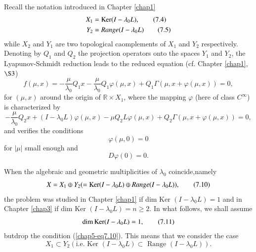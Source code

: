 Recall the notation introduced in Chapter \ref{chap1}
\begin{align*}
X_{1} & = \operatorname{Ker} (I - \lambda_{0}L),\tag{7.4}\label{chap5-eq7.4}\\
Y_{2} & = Range (I - \lambda_{0}L)\tag{7.5}\label{chap5-eq7.5}
\end{align*}\pageoriginale
while $X_{2}$ and $Y_{1}$ are two topological caomplements of $X_{1}$
and $Y_{2}$ respectively. Denoting by $Q_{1}$ and $Q_{2}$ the
projection operators onto the spaces $Y_{1}$ and $Y_{2}$, the
Lyapunov-Schmidt reduction leads to the reduced equation (cf. Chapter
\ref{chap1}, $\S 3$)
\begin{equation*}
f(\mu, x) = - \frac{\mu}{\lambda_{0}} Q_{1}x - \frac{\mu}{\lambda_{0}}
Q_{1}\varphi(\mu, x) + Q_{1}\Gamma(\mu, x + \varphi(\mu, x)) =
0,\tag{7.6}\label{chap5-eq7.6} 
\end{equation*}
for $(\mu, x)$ around the origin of $\mathbb{R} \times X_{1}$, where
the mapping $\varphi$ (here of class $C^{\infty}$) is characterized by
\begin{equation*}
- \frac{\mu}{\lambda_{0}} Q_{2}x + (I - \lambda_{0}L)\varphi(\mu,
x)-\mu Q_{2}L \varphi (\mu, x) + Q_{2}\Gamma(\mu, x + \varphi(\mu, x))
= 0,\tag{7.7}\label{chap5-eq7.7}
\end{equation*}
and verifies the conditions
\begin{equation*}
\varphi(\mu, 0) = 0\tag{7.8}\label{chap5-eq7.8}
\end{equation*}
for $|\mu|$ small enough and
\begin{equation*}
D\varphi(0) = 0.\tag{7.9}\label{chap5-eq7.9}
\end{equation*}


When the algebraic and geometric multiplicities of $\lambda_{0}$
coincide,\break namely
\begin{equation*}
X = X_{1} \oplus Y_{2} (= \operatorname{Ker} (I - \lambda_{0}L) \oplus Range (I -
\lambda_{0}L)),\tag{7.10}\label{chap5-eq7.10} 
\end{equation*}
the problem was studied in Chapter \ref{chap1} if dim Ker $(I -
\lambda_{0}L) = 1$ and in Chapter \ref{chap3} if dim Ker $(I -
\lambda_{0}L) = n \geq 2$. In what follows, we shall assume
\begin{equation*}
\dim \operatorname{Ker} (I - \lambda_{0}L) = 1,\tag{7.11}\label{chap5-eq7.11}
\end{equation*}
but\pageoriginale drop the condition (\ref{chap5-eq7.10}). This means
that we consider the case
\begin{equation*}
X_{1} \subset Y_{2} (\text{i.e. Ker }(I - \lambda_{0}L) \subset
\text{ Range } (I - \lambda_{0}L)).\tag{7.12}\label{chap5-eq7.12}
\end{equation*}

